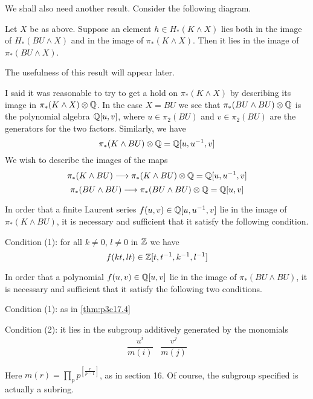 \documentclass[../main]{subfiles}
\begin{document}
We shall also need another result. Consider the following diagram.


\begin{theorem} \label{thm:p3c17.3}
Let $X$ be as above. Suppose an element $h\in H_*(K\wedge X)$ lies both in the image of $H_*({BU}\wedge X)$ and in the image of $\pi_*(K\wedge X)$. Then it lies in the image of $\pi_*({BU}\wedge X)$.
\end{theorem}
The usefulness of this result will appear later.

I said it was reasonable to try to get a hold on $\pi_*(K\wedge X)$ by
describing its image in $\pi_*(K\wedge X)\otimes\mathbb{Q}$. In the case $X={BU}$ we see that $\pi_*({BU}\wedge{BU})\otimes\mathbb{Q}$ is the polynomial algebra $\mathbb{Q}[u,v]$, where $u\in\pi_2({BU})$ and $v\in\pi_2({BU})$ are the generators for the two factors. Similarly, we have
\[
\pi_*(K\wedge{BU})\otimes\mathbb{Q} = \mathbb{Q}[u,u^{-1},v]
\]
We wish to describe the images of the maps
\[
\pi_*(K\wedge{BU}) \longrightarrow{} \pi_*(K\wedge{BU})\otimes\mathbb{Q} = \mathbb{Q}[u,u^{-1},v]
\]
\[
\pi_*({BU}\wedge{BU}) \longrightarrow{} \pi_*({BU}\wedge{BU})\otimes\mathbb{Q} = \mathbb{Q}[u,v]
\]

\begin{theorem} \label{thm:p3c17.4}
In order that a finite Laurent series $f(u,v)\in\mathbb{Q}[u,u^{-1},v]$ lie in the image of $\pi_*(K\wedge{BU})$, it is necessary and sufficient that it satisfy the following condition.

Condition (1): for all $k\ne0$, $l\ne0$ in $\mathbb{Z}$ we have
\[
f(kt,lt)\in\mathbb{Z}[t,t^{-1},k^{-1},l^{-1}]
\]
\end{theorem}

\begin{theorem} \label{thm:p3c17.5}
In order that a polynomial $f(u,v)\in\mathbb{Q}[u,v]$ lie in the image of $\pi_*({BU}\wedge{BU})$, it is necessary and sufficient that it satisfy the following two conditions.

Condition (1): as in \ref{thm:p3c17.4}

Condition (2): it lies in the subgroup additively generated by
the monomials
\[
\frac{u^i}{m(i)}\;\;\;\frac{v^j}{m(j)}
\]
\end{theorem}
Here $m(r)=\prod_p p^{\left[\frac{r}{p-1}\right]}$, as in section 16. Of course, the subgroup specified is actually a subring.
\end{document}
